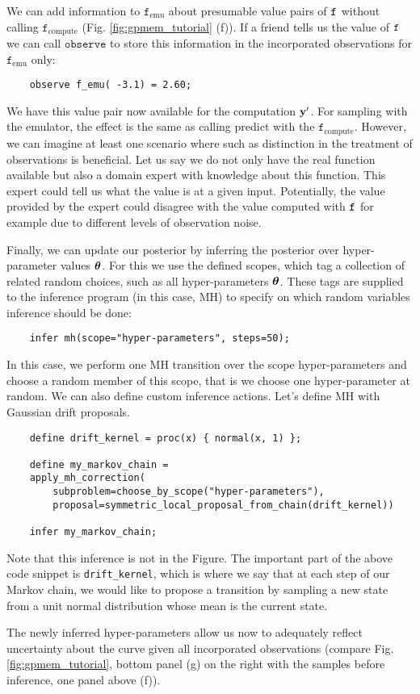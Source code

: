 We can add information to $\texttt{f}_\text{emu}$ about presumable value pairs of $\texttt{f}$ without calling $\texttt{f}_\text{compute}$
(Fig. \ref{fig:gpmem_tutorial} (f)).
If a friend tells us the value of $\texttt{f}$ we can call $\texttt{observe}$ to store this information in the incorporated observations for $\texttt{f}_\text{emu}$ only:
    \begin{lstlisting}
    observe f_emu( -3.1) = 2.60;
    \end{lstlisting}
We have this value pair now available for the computation $\mathbf{y}^\prime$. 
For sampling with the emulator, the effect is the same as calling predict with the $\texttt{f}_\text{compute}$.
However, we can imagine at least one scenario where such as distinction in the treatment of observations 
is beneficial. Let us say we do not only have the real function available but also a domain expert with knowledge 
about this function.
This expert could tell us what the value is at a given input.
Potentially, the value provided by the expert could disagree with the value computed with $\texttt{f}$ for example 
due to different levels of observation noise. 

Finally, we can update our posterior by inferring the posterior over hyper-parameter values $\bm{\theta}$.
For this we use the defined scopes, which tag a collection of related random choices, such
as all hyper-parameters $\bm{\theta}$.
These tags are supplied to the
inference program (in this case, MH) to specify on which random variables inference
should be done:
    \begin{lstlisting}
    infer mh(scope="hyper-parameters", steps=50);
    \end{lstlisting}
In this case, we perform one \ac{MH} transition over the scope hyper-parameters
and choose a random member of this scope, that is we choose one hyper-parameter at random.
We can also define custom inference actions. Let's define \ac{MH} with Gaussian
drift proposals.
    \begin{lstlisting}
    define drift_kernel = proc(x) { normal(x, 1) };

    define my_markov_chain =
	apply_mh_correction(
	    subproblem=choose_by_scope("hyper-parameters"),
	    proposal=symmetric_local_proposal_from_chain(drift_kernel))

    infer my_markov_chain;
    \end{lstlisting}
Note that this inference is not in the Figure. The important part of the above code snippet is \texttt{drift\_kernel}, which is where we say 
that at each step of our Markov chain, we would like to propose a transition by sampling
a new state from a unit normal distribution whose mean is the current state. 

The newly inferred hyper-parameters allow us now to adequately reflect uncertainty
about the curve given all incorporated observations (compare
Fig. \ref{fig:gpmem_tutorial}, bottom panel (g) on  the right with the samples
before inference, one panel above (f)).
